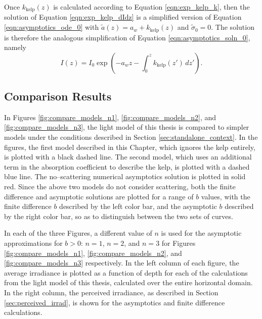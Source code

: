 Once $k_{\mbox{kelp}}(z)$ is calculated according to Equation \eqref{eqn:exp_kelp_k}, then the solution of Equation \eqref{eqn:exp_kelp_dIdz} is a simplified version of Equation \eqref{eqn:asymptotics_ode_0} with $\tilde{a}(z)=a_w+k_{\mbox{kelp}}(z)$ and $\tilde{\sigma}_0=0$.
The solution is therefore the analogous simplification of Equation \eqref{eqn:asymptotics_soln_0}, namely
\begin{equation}
  I(z) = I_0 \exp\left(-a_wz - \int_0^z k_{\mbox{kelp}}(z')\, dz' \right).
\end{equation}

\subsection{Comparison Results}
In Figures \ref{fig:compare_models_n1}, \ref{fig:compare_models_n2}, and \ref{fig:compare_models_n3}, the light model of this thesis is compared to simpler models under the conditions described in Section \ref{sec:standalone_context}.
In the figures, the first model described in this Chapter, which ignores the kelp entirely, is plotted with a black dashed line.
The second model, which uses an additional term in the absorption coefficient to describe the kelp, is plotted with a dashed blue line.
The no--scattering numerical asymptotics solution is plotted in solid red.
Since the above two models do not consider scattering, both the finite difference and asymptotic solutions are plotted for a range of $b$ values, with the finite difference $b$ described by the left color bar, and the asymptotic $b$ described by the right color bar, so as to distinguish between the two sets of curves.

In each of the three Figures, a different value of $n$ is used for the asymptotic approximations for $b>0$: $n=1$, $n=2$, and $n=3$ for Figures \ref{fig:compare_models_n1}, \ref{fig:compare_models_n2}, and \ref{fig:compare_models_n3} respectively.
In the left column of each figure, the average irradiance is plotted as a function of depth for each of the calculations from the light model of this thesis, calculated over the entire horizontal domain.
In the right column, the perceived irradiance, as described in Section \ref{sec:perceived_irrad}, is shown for the asymptotics and finite difference calculations.

